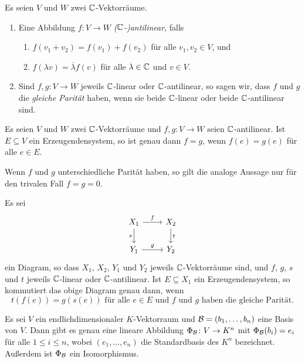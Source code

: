 \documentclass[a4paper,10pt,numbers=noenddot]{scrartcl}
\begin{document}
\begin{definition}
  Es seien $V$ und $W$ zwei $\mathbb{C}$-Vektorräume.
  \begin{enumerate}[leftmargin=*]
    \item 
      Eine Abbildung $f \colon V \to W$ \emph{($\mathbb{C}$-)antilinear}, falls
      \begin{enumerate}
        \item
          $f(v_1 + v_2) = f(v_1) + f(v_2)$ für alle $v_1, v_2 \in V$, und
        \item
          $f(\lambda v) = \overline{\lambda} f(v)$ für alle $\lambda \in \mathbb{C}$ und $v \in V$.
      \end{enumerate}
    \item
      Sind $f, g \colon V \to W$ jeweils $\mathbb{C}$-linear oder $\mathbb{C}$-antilinear, so sagen wir, dass $f$ und $g$ die \emph{gleiche Parität} haben, wenn sie beide $\mathbb{C}$-linear oder beide $\mathbb{C}$-antilinear sind.
  \end{enumerate}
\end{definition}


\begin{lemma}
  Es seien $V$ und $W$ zwei $\mathbb{C}$-Vektorräume und $f, g \colon V \to W$ seien $\mathbb{C}$-antilinear.
  Ist $E \subseteq V$ ein Erzeugendensystem, so ist genau dann $f = g$, wenn $f(e) = g(e)$ für alle $e \in E$.
\end{lemma}


\begin{remark}
  Wenn $f$ und $g$ unterschiedliche Parität haben, so gilt die analoge Aussage nur für den trivalen Fall $f = g = 0$.
\end{remark}


\begin{corollary}
  Es sei
  \[
    \begin{tikzcd}
        X_1
        \arrow[r, "f"]
        \arrow[d, "s"']
      & X_2
        \arrow[d, "t"]
      \\
        Y_1
        \arrow[r, "g"]
      & Y_2
    \end{tikzcd}
  \]
  ein Diagram, so dass $X_1$, $X_2$, $Y_1$ und $Y_2$ jeweils $\mathbb{C}$-Vektorräume sind, und $f$, $g$, $s$ und $t$ jeweils $\mathbb{C}$-linear oder $\mathbb{C}$-antilinear.
  Ist $E \subseteq X_1$ ein Erzeugendensystem, so kommutiert das obige Diagram genau dann, wenn
  \[
    \text{$t(f(e)) = g(s(e))$ für alle $e \in E$ und $f$ und $g$ haben die gleiche Parität}.
  \]
\end{corollary}


\begin{lemma}
  Es sei $V$ ein endlichdimensionaler $K$-Vektorraum und $\mathcal{B} = (b_1, \dotsc, b_n)$ eine Basis von $V$.
  Dann gibt es genau eine lineare Abbildung $\Phi_{\mathcal{B}} \colon V \to K^n$ mit $\Phi_{\mathcal{B}}(b_i) = e_i$ für alle $1 \leq i \leq n$, wobei $(e_1, \dotsc, e_n)$ die Standardbasis des $K^n$ bezeichnet.
  Außerdem ist $\Phi_{\mathcal{B}}$ ein Isomorphismus.
\end{lemma}
\end{document}
